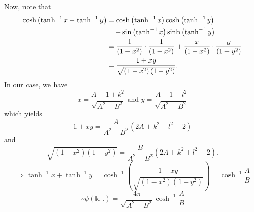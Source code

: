 Now, note that
\begin{align*}
    \cosh \left( \tanh^{-1} x + \tanh^{-1} y \right)
    &= \cosh \left( \tanh^{-1} x \right) \cosh \left( \tanh^{-1} y \right) \\
    &\quad + \sin \left( \tanh^{-1} x \right) \sinh \left( \tanh^{-1} y \right) \\
    &= \frac{1}{\left( 1 - x^2 \right)} \cdot \frac{1}{\left( 1 - x^2 \right)}
     + \frac{x}{\left( 1 - x^2 \right)} \cdot \frac{y}{\left( 1 - y^2 \right)} \\
    &= \frac{1 + xy}{\sqrt{\left( 1 - x^2 \right) \left( 1 - y^2 \right)}}.
\end{align*}
In our case, we have
\[
    x = \frac{A - 1 + k^2}{\sqrt{A^2 - B^2}} \text{ and } y = \frac{A - 1 + l^2}{\sqrt{A^2 - B^2}}
\]
which yields
\[
    1 + xy = \frac{A}{A^2 - B^2} \left( 2A + k^2 + l^2 - 2 \right)
\]
and
\[
    \sqrt{\left( 1 - x^2 \right) \left( 1 - y^2 \right)}
    = \frac{B}{A^2 - B^2} \left( 2A + k^2 + l^2 - 2 \right).
\]
\[
    \Rightarrow \tanh^{-1} x + \tanh^{-1} y
    = \cosh^{-1} \left( \frac{1 + xy}{\sqrt{\left( 1 - x^2 \right) \left( 1 - y^2 \right)}} \right)
    = \cosh^{-1} \frac{A}{B}
\]
\[
    \therefore \psi \left(\mathbb{k}, \mathbb{l} \right)
    = \frac{4\pi}{\sqrt{A^2 - B^2}} \cosh^{-1} \frac{A}{B}
\]